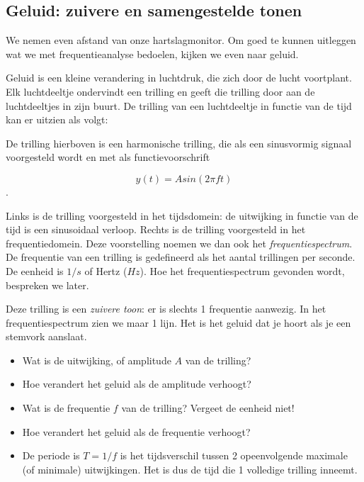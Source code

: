 \subsection{Geluid: zuivere en samengestelde tonen}

We nemen even afstand van onze hartslagmonitor. Om goed te kunnen uitleggen wat we met frequentieanalyse bedoelen, kijken we even naar geluid.

Geluid is een kleine verandering in luchtdruk, die zich door de lucht voortplant. Elk luchtdeeltje ondervindt een trilling en geeft die trilling door aan de luchtdeeltjes in zijn buurt. De trilling van een luchtdeeltje in functie van de tijd kan er uitzien als volgt:


De trilling hierboven is een harmonische trilling, die als een sinusvormig signaal voorgesteld wordt en met als functievoorschrift 

\begin{equation*}
y(t) = Asin(2\pi f t)
\end{equation*}. 

Links is de trilling voorgesteld in het tijdsdomein: de uitwijking in functie van de tijd is een sinusoidaal verloop. Rechts is de trilling voorgesteld in het frequentiedomein. Deze voorstelling noemen we dan ook het \emph{frequentiespectrum}. De frequentie van een trilling is gedefineerd als het aantal trillingen per seconde. De eenheid is $1/s$ of Hertz ($Hz$). Hoe het frequentiespectrum gevonden wordt, bespreken we later.

Deze trilling is een \emph{zuivere toon}: er is slechts 1 frequentie aanwezig. In het frequentiespectrum zien we maar 1 lijn. Het is het geluid dat je hoort als je een stemvork aanslaat.

\begin{oef}
\begin{itemize}
	\item Wat is de uitwijking, of amplitude $A$ van de trilling? 
	\item Hoe verandert het geluid als de amplitude verhoogt?
	\item Wat is de frequentie $f$ van de trilling? Vergeet de eenheid niet!
	\item Hoe verandert het geluid als de frequentie verhoogt?
	\item De periode is $T=1/f$ is het tijdsverschil tussen 2 opeenvolgende maximale (of minimale) uitwijkingen. Het is dus de tijd die 1 volledige trilling inneemt.
\end{itemize}
\end{oef}

